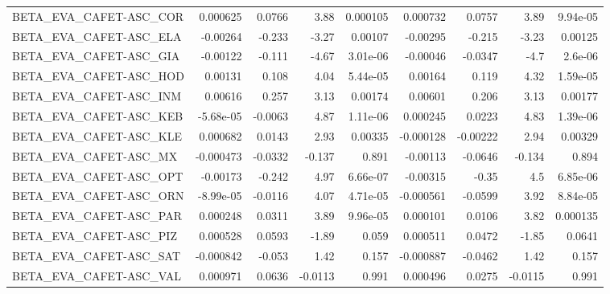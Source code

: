 \begin{tabular}{lrrrrrrrr}
BETA\_EVA\_CAFET-ASC\_COR                 &    0.000625 &       0.0766 &    3.88 & 0.000105 &   0.000732 &      0.0757 &         3.89 &      9.94e-05 \\
BETA\_EVA\_CAFET-ASC\_ELA                 &    -0.00264 &       -0.233 &   -3.27 &  0.00107 &   -0.00295 &      -0.215 &        -3.23 &       0.00125 \\
BETA\_EVA\_CAFET-ASC\_GIA                 &    -0.00122 &       -0.111 &   -4.67 & 3.01e-06 &   -0.00046 &     -0.0347 &         -4.7 &       2.6e-06 \\
BETA\_EVA\_CAFET-ASC\_HOD                 &     0.00131 &        0.108 &    4.04 & 5.44e-05 &    0.00164 &       0.119 &         4.32 &      1.59e-05 \\
BETA\_EVA\_CAFET-ASC\_INM                 &     0.00616 &        0.257 &    3.13 &  0.00174 &    0.00601 &       0.206 &         3.13 &       0.00177 \\
BETA\_EVA\_CAFET-ASC\_KEB                 &   -5.68e-05 &      -0.0063 &    4.87 & 1.11e-06 &   0.000245 &      0.0223 &         4.83 &      1.39e-06 \\
BETA\_EVA\_CAFET-ASC\_KLE                 &    0.000682 &       0.0143 &    2.93 &  0.00335 &  -0.000128 &    -0.00222 &         2.94 &       0.00329 \\
BETA\_EVA\_CAFET-ASC\_MX                  &   -0.000473 &      -0.0332 &  -0.137 &    0.891 &   -0.00113 &     -0.0646 &       -0.134 &         0.894 \\
BETA\_EVA\_CAFET-ASC\_OPT                 &    -0.00173 &       -0.242 &    4.97 & 6.66e-07 &   -0.00315 &       -0.35 &          4.5 &      6.85e-06 \\
BETA\_EVA\_CAFET-ASC\_ORN                 &   -8.99e-05 &      -0.0116 &    4.07 & 4.71e-05 &  -0.000561 &     -0.0599 &         3.92 &      8.84e-05 \\
BETA\_EVA\_CAFET-ASC\_PAR                 &    0.000248 &       0.0311 &    3.89 & 9.96e-05 &   0.000101 &      0.0106 &         3.82 &      0.000135 \\
BETA\_EVA\_CAFET-ASC\_PIZ                 &    0.000528 &       0.0593 &   -1.89 &    0.059 &   0.000511 &      0.0472 &        -1.85 &        0.0641 \\
BETA\_EVA\_CAFET-ASC\_SAT                 &   -0.000842 &       -0.053 &    1.42 &    0.157 &  -0.000887 &     -0.0462 &         1.42 &         0.157 \\
BETA\_EVA\_CAFET-ASC\_VAL                 &    0.000971 &       0.0636 & -0.0113 &    0.991 &   0.000496 &      0.0275 &      -0.0115 &         0.991 \\

\end{tabular}
